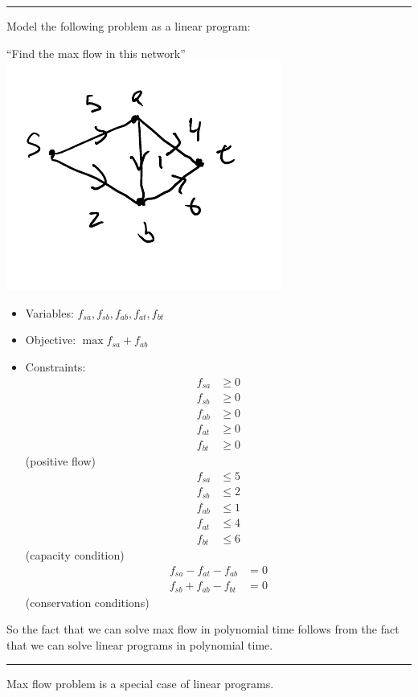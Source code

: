 \documentclass[12 pt]{article}
\begin{document}
         \noindent \rule{\textwidth}{0.5pt}
        Model the following problem as a linear program:

        ``Find the max flow in this network''
        \\ \includegraphics[width=.9\textwidth]{i96.pdf}
        \begin{itemize}
        \item Variables: $f_{sa}, f_{sb}, f_{ab}, f_{at}, f_{bt} $
        \item Objective: $\max f_{sa} + f_{ab}$
        \item Constraints:
          \begin{align*}
            f_{sa} & \geq 0
            \\ f_{sb} & \geq 0
            \\ f_{ab} & \geq 0
            \\ f_{at} & \geq 0
            \\ f_{bt} & \geq 0
          \end{align*}
          (positive flow)
          \begin{align*}
            f_{sa} & \leq 5
            \\ f_{sb} & \leq 2
            \\ f_{ab} & \leq 1
            \\ f_{at} & \leq 4
            \\ f_{bt} & \leq 6 
          \end{align*}
          (capacity condition)
          \begin{align*}
            f_{sa} - f_{at} - f_{ab} & = 0
            \\ f_{sb} + f_{ab} - f_{bt} & = 0
          \end{align*}
          (conservation conditions)
        \end{itemize}
        So the fact that we can solve max flow in polynomial time
        follows from the fact that we can solve linear programs in
        polynomial time.
        \\ \noindent \rule{\textwidth}{0.5pt}
        Max flow problem is a special case of linear programs.
\end{document}
